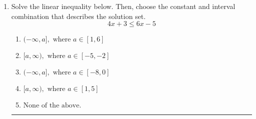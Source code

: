 \documentclass[14pt]{extbook}
\newcommand{\litem}[1]{\item#1\hspace*{-1cm}\rule{\textwidth}{0.4pt}}
\begin{document}
\begin{enumerate}
{\begin{enumerate}[label=\Alph*.]
\end{enumerate} }
\litem{
Solve the linear inequality below. Then, choose the constant and interval combination that describes the solution set.\[ 4x + 3 \leq 6x -5 \]\begin{enumerate}[label=\Alph*.]
\item \( (-\infty, a], \text{ where } a \in [1, 6] \)
\item \( [a, \infty), \text{ where } a \in [-5, -2] \)
\item \( (-\infty, a], \text{ where } a \in [-8, 0] \)
\item \( [a, \infty), \text{ where } a \in [1, 5] \)
\item \( \text{None of the above}. \)

\end{enumerate} }
\end{enumerate}
\end{document}
